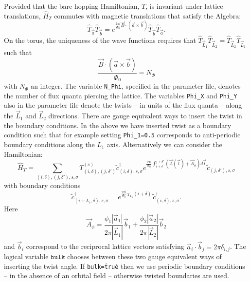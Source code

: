 Provided that the bare hopping Hamiltonian, $T$,  is invariant under lattice translations, $\hat{H}_T$ commutes with magnetic translations  that satisfy the  Algebra: 
\begin{equation}
\hat{T}_{\vec{a}} \hat{T}_{\vec{b}} =  e^{ \frac{2 \pi i}{\Phi_0}   \vec{B} \cdot \left( \vec{a} \times \vec{b} \right) }  \hat{T}_{\vec{b}} \hat{T}_{\vec{a}}. 
\end{equation}
On the  torus, the uniqueness of the wave functions requires that  $\hat{T}_{\vec{L}_1} \hat{T}_{\vec{L}_2}  =   \hat{T}_{\vec{L}_2} \hat{T}_{\vec{L}_1} $ such
that
\begin{equation}
\frac{\vec{B} \cdot \left( \vec{a} \times \vec{b}  \right) }{\Phi_0 } = N_{\Phi}   
\end{equation}
with  $N_\Phi $ an integer.  The variable \texttt{N\_Phi},   specified in the parameter file,   denotes the number of flux quanta piercing the lattice.    The variables \texttt{Phi\_X}  and   \texttt{Phi\_Y} also   in the parameter file denote  the twists  -- in units of the flux quanta  --  along the $\vec{L}_1$ and  $\vec{L}_2$ directions.     There are gauge  equivalent ways to insert the  twist in the boundary conditions. In the above we  have inserted   twist as a boundary condition such  that for example setting  \texttt{Phi\_1=0.5}  corresponds to anti-periodic boundary conditions along the $L_1$  axis.   Alternatively we  can  consider the 
Hamiltonian:
\begin{equation}
\hat{H}_T = \sum_{(i,\delta), (j,\delta'), s, \sigma}    T_{(i,\delta), (j,\delta')}^{(s)}    \tilde{c}^{\dagger}_{(i,\delta),s,\sigma }   e^{\frac{2 \pi i}{\Phi_0} \int_{i + \delta}^{j + \delta'} \left(  \vec{A}(\vec{l})  + \vec{A}_{\phi} \right)  d \vec{l}} \tilde{c}^{}_{(j,\delta'),s,\sigma }
\end{equation}
with boundary conditions 
\begin{equation}
\tilde{c}^{\dagger}_{(i + L_i,\delta) ,s,\sigma }   =  e^{\frac{2 \pi i }{\Phi_0} \chi_{L_i} ( i + \delta ) } \, \tilde{c}^{\dagger}_{(i,\delta) ,s,\sigma }.
\end{equation}
Here 
\begin{equation}
\vec{A}_{\phi} =\frac{  \phi_1  |\vec{a}_1|} { 2 \pi |\vec{L}_1| } \vec{b}_1 +  \frac{  \phi_2  |\vec{a}_2|}{2 \pi  |\vec{L}_2| } \vec{b}_2
\end{equation}
and $\vec{b}_i$  correspond to the reciprocal lattice vectors satisfying  $ \vec{a}_i  \cdot  \vec{b}_j  = 2 \pi \delta_{i,j} $.   The logical variable $\texttt{bulk} $ chooses between these two  gauge equivalent ways  of inserting the twist angle. If \texttt{bulk=\.true\.}    then  we use periodic boundary conditions  --  in the absence of an orbital field -- otherwise  twisted boundaries are used.  
